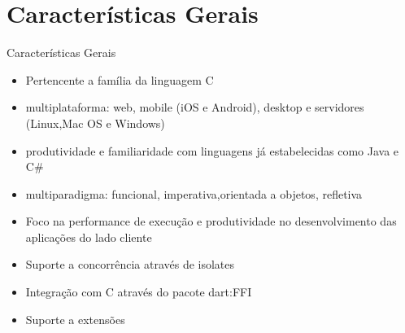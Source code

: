 \documentclass[usenames,dvipsnames,10pt]{beamer}
\begin{document}

\section{Características Gerais}

\begin{frame}[fragile]{Características Gerais}

%
%
%
%

\begin{itemize}

	\item{Pertencente a família da linguagem C}
	\item{multiplataforma: web, mobile (iOS e Android), desktop e servidores (Linux,Mac OS e Windows)}	
	\item{produtividade e familiaridade com linguagens já estabelecidas como Java e C\#}
	\item{multiparadigma: funcional, imperativa,orientada a objetos, refletiva}
	\item{Foco na performance de execução e produtividade no desenvolvimento das aplicações do lado cliente}
	\item{Suporte a concorrência através de isolates}
	\item{Integração com C através do pacote dart:FFI}
	\item{Suporte a extensões}
	
\end{itemize}

\end{frame}
\end{document}

